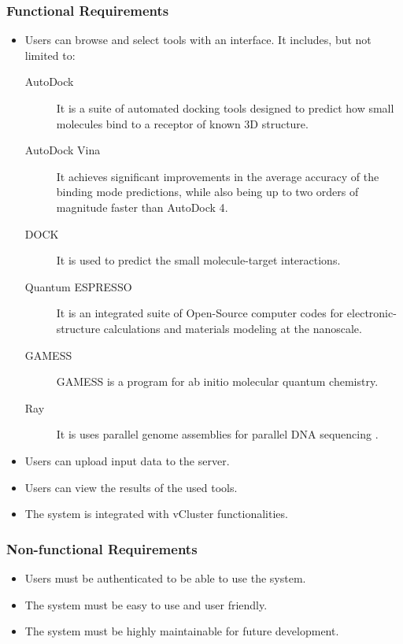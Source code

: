 \documentclass[journal]{./IEEE/IEEEtran}
\begin{document}
        \subsubsection{Functional Requirements}
        \begin{itemize}
          \item Users can browse and select tools with an interface. It includes, but not limited to:
          \begin{description}
          	\item[AutoDock] \hfill \break 
            It is a suite of automated docking tools designed to predict how small molecules bind to a receptor of known 3D structure\cite{morris2009autodock4}.
            \item[AutoDock Vina] \hfill \break
            It achieves significant improvements in the average accuracy of the binding mode predictions, while also being up to two orders of magnitude faster than AutoDock 4\cite{JCC:JCC21334}.
            \item[DOCK] \hfill \break
            It is used to predict the small molecule-target interactions\cite{lang2009dock}.
            \item[Quantum ESPRESSO] \hfill \break
It is an integrated suite of Open-Source computer codes for electronic-structure calculations and materials modeling at the nanoscale\cite{QE-2009}.
            \item[GAMESS] \hfill \break
            GAMESS is a program for ab initio molecular quantum chemistry. \cite{1993gamess}
            \item[Ray] \hfill \break
            It is uses parallel genome assemblies for parallel DNA sequencing \cite{boisvert_ray_2012}.
          \end{description}
          \item Users can upload input data to the server.
          \item Users can view the results of the used tools.
          \item The system is integrated with vCluster functionalities.
        \end{itemize}
        \subsubsection{Non-functional Requirements}
        \begin{itemize}
          \item Users must be authenticated to be able to use the system.
          \item The system must be easy to use and user friendly.
          \item The system must be highly maintainable for future development.  
        \end{itemize}
	
\end{document}

